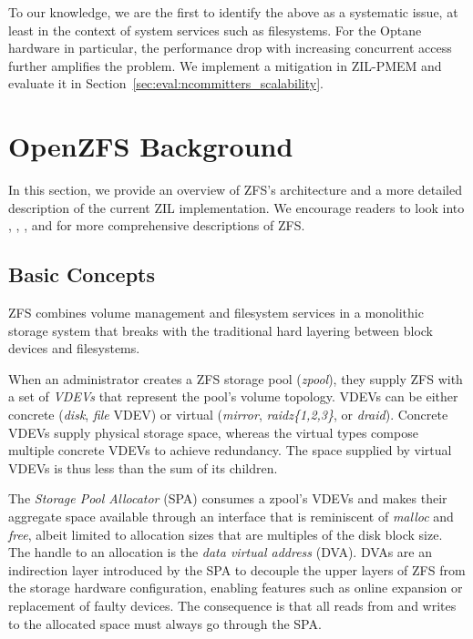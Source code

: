 \documentclass[12pt,a4paper,twoside]{book}
\begin{document}
\begin{description}
        To our knowledge, we are the first to identify the above as a systematic issue, at least in the context of system services such as filesystems.
        For the Optane hardware in particular, the performance drop with increasing concurrent access further amplifies the problem.
        We implement a mitigation in ZIL-PMEM and evaluate it in Section~\ref{sec:eval:ncommitters_scalability}.
\end{description}

\section{OpenZFS Background}\label{sec:openzfs_background}

In this section, we provide an overview of ZFS's architecture and a more detailed description of the current ZIL implementation.
We encourage readers to look into \cite{bonwickZettabyteFileSystem2003}, \cite{zhangEndtoendDataIntegrity2010}, \cite{mckusickDesignImplementationFreeBSD2014}, and \cite{openzfsMattAhrensLecture2016} for more comprehensive descriptions of ZFS.

\subsection{Basic Concepts}\label{sec:openzfs_background:basic_concepts}
ZFS combines volume management and filesystem services in a monolithic storage system that breaks with the traditional hard layering between block devices and filesystems.

When an administrator creates a ZFS storage pool (\textit{zpool}), they supply ZFS with a set of \textit{VDEVs} that represent the pool's volume topology.
VDEVs can be either concrete (\textit{disk}, \textit{file} VDEV) or virtual (\textit{mirror}, \textit{raidz\{1,2,3\}}, or \textit{draid}).
Concrete VDEVs supply physical storage space, whereas the virtual types compose multiple concrete VDEVs to achieve redundancy.
The space supplied by virtual VDEVs is thus less than the sum of its children.

The \textit{Storage Pool Allocator} (SPA) consumes a zpool's VDEVs and makes their aggregate space available through an interface that is reminiscent of \textit{malloc} and \textit{free}, albeit limited to allocation sizes that are multiples of the disk block size.
The handle to an allocation is the \textit{data virtual address} (DVA).
DVAs are an indirection layer introduced by the SPA to decouple the upper layers of ZFS from the storage hardware configuration, enabling features such as online expansion or replacement of faulty devices.
The consequence is that all reads from and writes to the allocated space must always go through the SPA.
\end{document}
